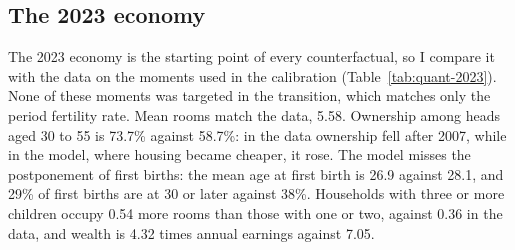 \subsection{The 2023 economy}
\label{sec:quant-2023}

The 2023 economy is the starting point of every counterfactual, so I compare
it with the data on the moments used in the calibration
(Table~\ref{tab:quant-2023}). None of these moments was targeted in the
transition, which matches only the period fertility rate. Mean rooms match
the data, 5.58. Ownership among heads aged 30
to 55 is 73.7\% against 58.7\%: in the data ownership fell
after 2007, while in the model, where housing became cheaper, it rose. The
model misses the postponement of first births: the mean age at first birth is
26.9 against 28.1, and 29\% of first births
are at 30 or later against 38\%. Households with three or more children
occupy 0.54 more rooms than those with one or two, against
0.36 in the data, and wealth is 4.32 times annual earnings
against 7.05.

